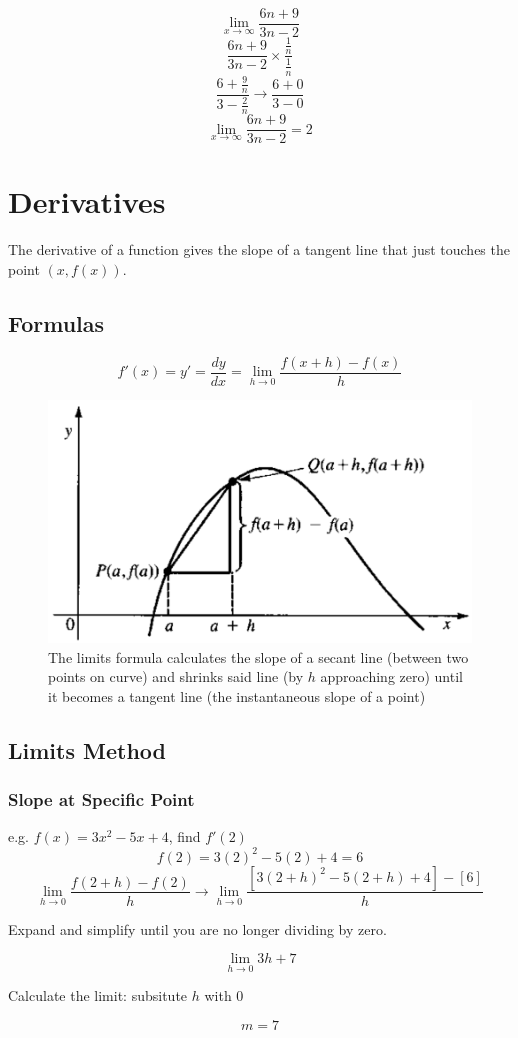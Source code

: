 \documentclass[a4paper,12pt]{article}
\begin{document}
$$\lim\limits_{x\to\infty}{\frac{6n+9}{3n-2}}$$
$$\frac{6n+9}{3n-2} \times \frac{\frac{1}{n}}{\frac{1}{n}}$$
$$\frac{6+\frac{9}{n}}{3-\frac{2}{n}} \longrightarrow \frac{6+0}{3-0}$$
$$\lim\limits_{x\to\infty}{\frac{6n+9}{3n-2}} = 2$$

\section{Derivatives}
The derivative of a function gives the slope of a tangent line that just touches the point $(x, f(x))$.

\subsection{Formulas}
\Large
$$f'(x) = y' = \frac{dy}{dx} = \lim\limits_{h\to0}{\frac{f(x+h)-f(x)}{h}}$$
\normalsize
\begin{figure}[H]
    \centering
    \includegraphics[width=\textwidth]{hgraph}
    \caption{The limits formula calculates the slope of a secant line (between two points on curve) and shrinks said line (by $h$ approaching zero) until it becomes a tangent line (the instantaneous slope of a point)}
\end{figure}

\subsection{Limits Method}
\subsubsection{Slope at Specific Point}
e.g. $f(x) = 3x^2 - 5x + 4$, find $f'(2)$
$$f(2) = 3(2)^2 - 5(2) + 4 = 6$$
$$\lim\limits_{h\to0}\frac{f(2+h)-f(2)}{h} \longrightarrow \lim\limits_{h\to0}\frac{[3(2+h)^2 - 5(2+h) + 4] - [6]}{h}$$
\begin{center}Expand and simplify until you are no longer dividing by zero.\end{center}
$$\lim\limits_{h\to0}{3h+7}$$
\begin{center}Calculate the limit: subsitute $h$ with $0$\end{center}
$$m = 7$$
\end{document}
